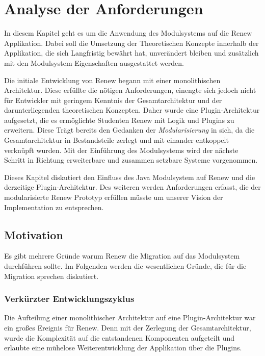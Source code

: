 \chapter{Analyse der Anforderungen}\label{cha:anforderungen}
In diesem Kapitel geht es um die Anwendung des Modulsystems auf die Renew Applikation. Dabei soll die Umsetzung der Theoretischen Konzepte innerhalb der Applikation, die sich Langfristig bewährt hat, unverändert bleiben und zusätzlich mit den Modulsystem Eigenschaften ausgestattet werden. \bigbreak


Die initiale Entwicklung von Renew begann mit einer monolithischen Architektur. Diese erfüllte die nötigen Anforderungen, einengte sich jedoch nicht für Entwickler mit geringem Kenntnis der Gesamtarchitektur und der darunterliegenden theoretischen Konzepten. Daher wurde eine Plugin-Architektur aufgesetzt, die es ermöglichte Studenten Renew mit Logik und Plugins zu erweitern. Diese Trägt bereits den Gedanken der \textit{Modularisierung} in sich, da die Gesamtarchitektur in Bestandsteile zerlegt und mit einander entkoppelt verknüpft wurden. Mit der Einführung des Modulsystems wird der nächste Schritt in Richtung erweiterbare und zusammen setzbare Systeme vorgenommen. \bigbreak


Dieses Kapitel diskutiert den Einfluss des Java Modulsystem auf Renew und die derzeitige Plugin-Architektur. Des weiteren werden Anforderungen erfasst, die der modularisierte Renew Prototyp erfüllen müsste um unserer Vision der Implementation zu entsprechen. 


\section{Motivation}\label{sec:motivation}

Es gibt mehrere Gründe warum Renew die Migration auf das Modulsystem durchführen sollte. Im Folgenden werden die wesentlichen Gründe, die für die Migration sprechen diskutiert.  


\subsection{Verkürzter Entwicklungszyklus}\label{sub:vez}

Die Aufteilung einer monolithischer Architektur auf eine Plugin-Architektur war ein großes Ereignis für Renew. Denn mit der Zerlegung der Gesamtarchitektur, wurde die Komplexität auf die entstandenen Komponenten aufgeteilt und erlaubte eine mühelose Weiterentwicklung der Applikation über die Plugins. \bigbreak


